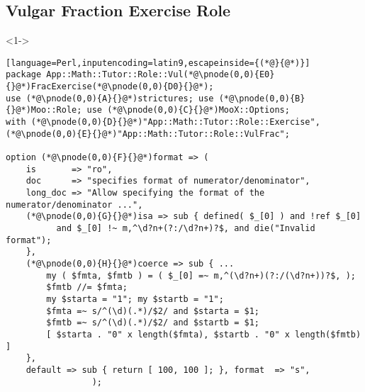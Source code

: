 \documentclass[ngerman,xcolor={table,dvipsnames},smaller,compress,hyperref={bookmarks,colorlinks}]{beamer}
\begin{document}
\subsection{Vulgar Fraction Exercise Role}

\begin{frame}[t,fragile]

\begin{block}<1->{}
\scriptsize
\begin{lstlisting}[language=Perl,inputencoding=latin9,escapeinside={(*@}{@*)}]
package App::Math::Tutor::Role::Vul(*@\pnode(0,0){E0}{}@*)FracExercise(*@\pnode(0,0){D0}{}@*);
use (*@\pnode(0,0){A}{}@*)strictures; use (*@\pnode(0,0){B}{}@*)Moo::Role; use (*@\pnode(0,0){C}{}@*)MooX::Options;
with (*@\pnode(0,0){D}{}@*)"App::Math::Tutor::Role::Exercise", (*@\pnode(0,0){E}{}@*)"App::Math::Tutor::Role::VulFrac";

option (*@\pnode(0,0){F}{}@*)format => (
    is       => "ro",
    doc      => "specifies format of numerator/denominator",
    long_doc => "Allow specifying the format of the numerator/denominator ...",
    (*@\pnode(0,0){G}{}@*)isa => sub { defined( $_[0] ) and !ref $_[0]
          and $_[0] !~ m,^\d?n+(?:/\d?n+)?$, and die("Invalid format");
    },
    (*@\pnode(0,0){H}{}@*)coerce => sub { ...
        my ( $fmta, $fmtb ) = ( $_[0] =~ m,^(\d?n+)(?:/(\d?n+))?$, );
        $fmtb //= $fmta;
        my $starta = "1"; my $startb = "1";
        $fmta =~ s/^(\d)(.*)/$2/ and $starta = $1;
        $fmtb =~ s/^(\d)(.*)/$2/ and $startb = $1;
        [ $starta . "0" x length($fmta), $startb . "0" x length($fmtb) ]
    },
    default => sub { return [ 100, 100 ]; }, format  => "s",
                 );
\end{lstlisting}
\end{block}

\begin{itemize}
\end{itemize}
\end{frame}
\end{document}
